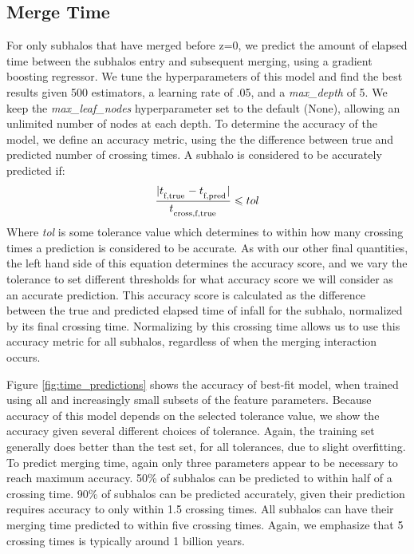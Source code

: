 \documentclass[fleqn,usenatbib]{mnras}
\begin{document}
\subsection{Merge Time}
\label{sec:merge time}
For only subhalos that have merged before z=0, we predict the amount of elapsed time between the subhalos entry and subsequent merging, using a gradient boosting regressor. We tune the hyperparameters of this model and find the best results given 500 estimators, a learning rate of .05, and a \textit{max\_depth} of 5. We keep the \textit{max\_leaf\_nodes} hyperparameter set to the default (None), allowing an unlimited number of nodes at each depth. To determine the accuracy of the model, we define an accuracy metric, using the the difference between true and predicted number of crossing times. A subhalo is considered to be accurately predicted if:
\begin{equation}
    \label{eq:time}
    \frac{|t_\textsubscript{f,true} - t_\textsubscript{f,pred}|}{t_\textsubscript{cross,f,true}} \leq tol
\end{equation}
Where \textit{tol} is some tolerance value which determines to within how many crossing times a prediction is considered to be accurate. As with our other final quantities, the left hand side of this equation determines the accuracy score, and we vary the tolerance to set different thresholds for what accuracy score we will consider as an accurate prediction. This accuracy score is calculated as the difference between the true and predicted elapsed time of infall for the subhalo, normalized by its final crossing time. Normalizing by this crossing time allows us to use this accuracy metric for all subhalos, regardless of when the merging interaction occurs.

Figure \ref{fig:time_predictions} shows the accuracy of best-fit model, when trained using all and increasingly small subsets of the feature parameters. Because accuracy of this model depends on the selected tolerance value, we show the accuracy given several different choices of tolerance. Again, the training set generally does better than the test set, for all tolerances, due to slight  overfitting. To predict merging time, again only three parameters appear to be necessary to reach maximum accuracy. 50\% of subhalos can be predicted to within half of a crossing time. 90\% of subhalos can be predicted accurately, given their prediction requires accuracy to only within 1.5 crossing times. All subhalos can have their merging time predicted to within five crossing times. Again, we emphasize that 5 crossing times is typically around 1 billion years.
\end{document}
